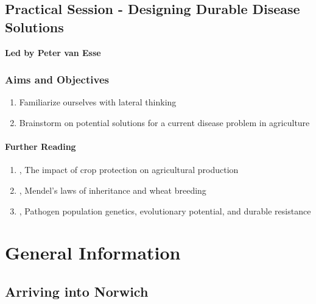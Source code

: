 \documentclass[12pt,]{book}
\providecommand{\tightlist}{%
  \setlength{\itemsep}{0pt}\setlength{\parskip}{0pt}}
\theoremstyle{definition}
\theoremstyle{definition}
\theoremstyle{remark}
\begin{document}
\section*{Practical Session - Designing Durable Disease
Solutions}\label{practical-session---designing-durable-disease-solutions}

\textbf{Led by Peter van Esse}

\subsection*{Aims and Objectives}\label{aims-and-objectives-8}

\begin{enumerate}
\def\labelenumi{\arabic{enumi}.}
\tightlist
\item
  Familiarize ourselves with lateral thinking
\item
  Brainstorm on potential solutions for a current disease problem in
  agriculture
\end{enumerate}

\subsubsection*{Further Reading}\label{further-reading}

\begin{enumerate}
\def\labelenumi{\arabic{enumi}.}
\tightlist
\item
  \citet{Popp:102401}, The impact of crop protection on agricultural
  production
\item
  \citet{biffen_1905}, Mendel's laws of inheritance and wheat breeding
\item
  \citet{McDonald:2002da}, Pathogen population genetics, evolutionary
  potential, and durable resistance
\end{enumerate}

\chapter*{General Information}\label{general-information}

\section*{Arriving into Norwich}\label{arriving-into-norwich}
\end{document}
